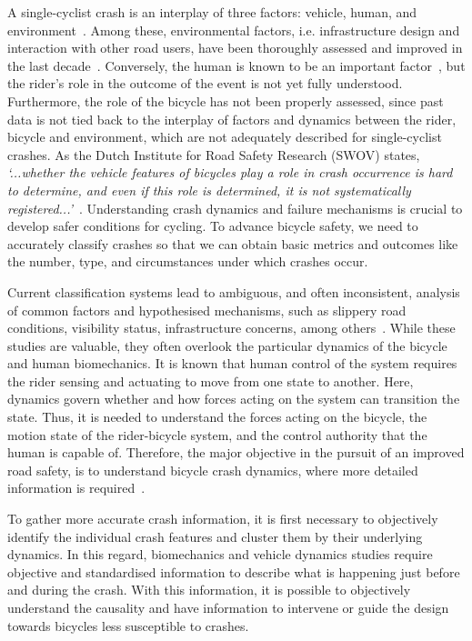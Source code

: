 \documentclass{article}
\begin{document}
A single-cyclist crash is an interplay of three factors: vehicle, human, and environment~\cite{Fel76, Zha22}.
%
Among these, environmental factors, i.e. infrastructure design and interaction with other road users, have been thoroughly assessed and improved in the last decade~\cite{Sch17a}.
%
Conversely, the human is known to be an important factor~\cite{Orm09}, but the rider's role in the outcome of the event is not yet fully understood.
%
Furthermore, the role of the bicycle has not been properly assessed, since past data is not tied back to the interplay of factors and dynamics between the rider, bicycle and environment, which are not adequately described for single-cyclist crashes.
%
As the Dutch Institute for Road Safety Research (SWOV) states, \textit{`...whether the vehicle features of bicycles play a role in crash occurrence is hard to determine, and even if this role is determined, it is not systematically registered...'}~\cite{Sti23}.
%
Understanding crash dynamics and failure mechanisms is crucial to develop safer conditions for cycling.
%
To advance bicycle safety, we need to accurately classify crashes so that we can obtain basic metrics and outcomes like the number, type, and circumstances under which crashes occur.


Current classification systems lead to ambiguous, and often inconsistent, analysis of common factors and hypothesised mechanisms, such as slippery road conditions, visibility status, infrastructure concerns, among others~\cite{Utr23}.
%
While these studies are valuable, they often overlook the particular dynamics of the bicycle and human biomechanics.
%
It is known that human control of the system requires the rider sensing and actuating to move from one state to another.
%
Here, dynamics govern whether and how forces acting on the system can transition the state.
%
Thus, it is needed to understand the forces acting on the bicycle, the motion state of the rider-bicycle system, and the control authority that the human is capable of.
%
Therefore, the major objective in the pursuit of an improved road safety, is to understand bicycle crash dynamics, where more detailed information is required~\cite{Haw13, Møl21}.


To gather more accurate crash information, it is first necessary to objectively identify the individual crash features and cluster them by their underlying dynamics.
%
In this regard, biomechanics and vehicle dynamics studies require objective and standardised information to describe what is happening just before and during the crash.
%
With this information, it is possible to objectively understand the causality and have information to intervene or guide the design towards bicycles less susceptible to crashes.
\end{document}
